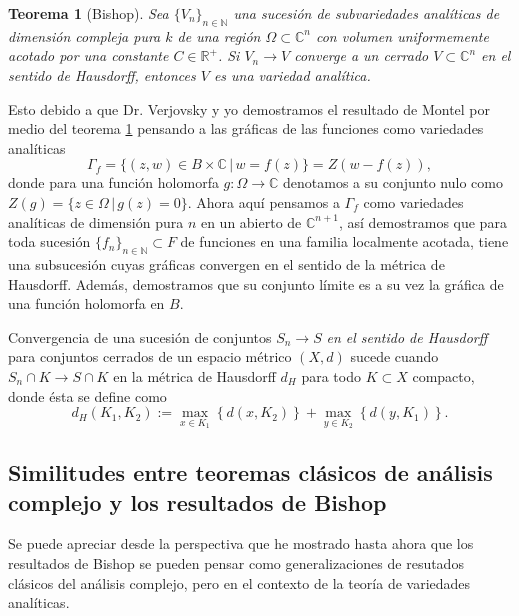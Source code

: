 \documentclass{article}
\newtheorem{teorema}{Teorema}[section]
\newcommand{\nat}{\ensuremath{ \mathbb N }}
\newcommand{\co}{\ensuremath{\mathbb C }}
\newcommand{\con}{\ensuremath{\mathbb{C}^n}}
\newcommand{\re}{\ensuremath{\mathbb R }}
\begin{document}
\begin{teorema}[Bishop]\label{Bishop2}
        Sea $\{ V_n \}_{n\in\nat}$ una sucesi\'on de subvariedades anal\'iticas de dimensi\'on compleja pura $k$ de una regi\'on 
        $\Omega\subset\con$ con volumen uniformemente acotado por una constante $C\in\re^{+}$.
        Si $V_n\rightarrow V$ converge a un cerrado $V\subset\con$ en el sentido de Hausdorff, entonces $V$ es una 
        variedad anal\'itica. 
\end{teorema}
Esto debido a que Dr. Verjovsky y yo demostramos el resultado de Montel por medio del teorema \ref{Bishop2} pensando a las gr\'aficas de las
funciones como variedades anal\'iticas
\[
        \Gamma_{f}=\{(z,w)\in B\times\co\,|\,w=f(z)\}=Z(w-f(z)),
\]
\noindent donde para una funci\'on holomorfa $g:\Omega\rightarrow\co$ denotamos a su conjunto nulo como $Z(g)=\{z\in\Omega\,|\,g(z)=0\}$. Ahora aqu\'i 
pensamos a $\Gamma_{f}$ como variedades anal\'iticas de dimensi\'on pura $n$ en un abierto de $\co^{n+1}$, as\'i demostramos 
que para toda sucesi\'on $\{f_n\}_{n\in\nat}\subset F$ de funciones en una familia localmente acotada, tiene una subsucesi\'on 
cuyas gr\'aficas convergen en el sentido de la m\'etrica de Hausdorff. Adem\'as, demostramos que su conjunto l\'imite 
es a su vez la gr\'afica de una funci\'on holomorfa en $B$.

Convergencia de una sucesi\'on de conjuntos $S_n\rightarrow S$ \emph{en el sentido de Hausdorff} para conjuntos cerrados de un espacio m\'etrico $(X,d)$
sucede cuando $S_n\cap K\rightarrow S\cap K$ en la m\'etrica de Hausdorff $d_H$ para todo $K\subset X$ compacto, donde \'esta se define como
\[
        d_H(K_1,K_2):= \max_{x\in K_1}\left\{d(x,K_2)\right\}+\max_{y\in K_2}\left\{d(y,K_1)\right\}. 
\]

\subsection{Similitudes entre teoremas cl\'asicos de an\'alisis complejo y los resultados de Bishop}

\noindent Se puede apreciar desde la perspectiva que he mostrado hasta ahora que los resultados de Bishop se pueden pensar 
como generalizaciones de resutados cl\'asicos del an\'alisis complejo, pero en el contexto de la teor\'ia de variedades anal\'iticas.
\end{document}
